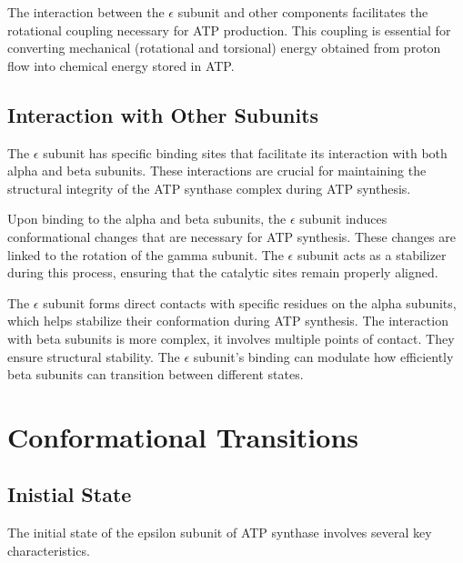 \documentclass{article}
\begin{document}
The interaction between the $\epsilon$ subunit and other components facilitates the rotational coupling necessary for ATP production. This coupling is essential for converting mechanical (rotational and torsional) energy obtained from proton flow into chemical energy stored in ATP.

\subsection{Interaction with Other Subunits}

The $\epsilon$ subunit has specific binding sites that facilitate its interaction with both alpha and beta subunits. These interactions are crucial for maintaining the structural integrity of the ATP synthase complex during ATP synthesis.

Upon binding to the alpha and beta subunits, the $\epsilon$ subunit induces conformational changes that are necessary for ATP synthesis. These changes are linked to the rotation of the gamma subunit. The $\epsilon$ subunit acts as a stabilizer during this process, ensuring that the catalytic sites remain properly aligned.

The $\epsilon$ subunit forms direct contacts with specific residues on the alpha subunits, which helps stabilize their conformation during ATP synthesis. The interaction with beta subunits is more complex, it involves multiple points of contact. They ensure structural stability. The $\epsilon$ subunit's binding can modulate how efficiently beta subunits can transition between different states.

\section{Conformational Transitions}

\subsection{Inistial State}

The initial state of the epsilon subunit of ATP synthase involves several key characteristics.
\end{document}
